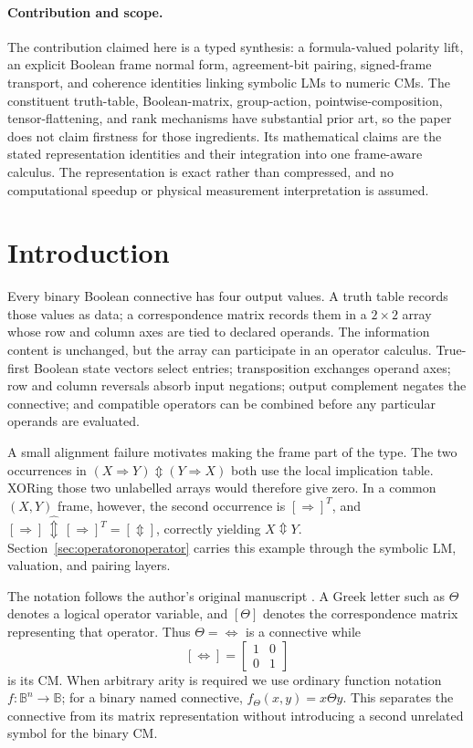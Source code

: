 \documentclass[11pt]{article}
\theoremstyle{definition}
\theoremstyle{remark}
\newcommand{\B}{\mathbb B}
\newcommand{\xor}{\mathbin{\Updownarrow}}
\begin{document}
\paragraph{Contribution and scope.}
The contribution claimed here is a typed synthesis: a formula-valued polarity lift, an explicit Boolean frame normal form, agreement-bit pairing, signed-frame transport, and coherence identities linking symbolic LMs to numeric CMs.  The constituent truth-table, Boolean-matrix, group-action, pointwise-composition, tensor-flattening, and rank mechanisms have substantial prior art, so the paper does not claim firstness for those ingredients.  Its mathematical claims are the stated representation identities and their integration into one frame-aware calculus.  The representation is exact rather than compressed, and no computational speedup or physical measurement interpretation is assumed.

\section{Introduction}

Every binary Boolean connective has four output values.  A truth table records those values as data; a correspondence matrix records them in a $2\times2$ array whose row and column axes are tied to declared operands.  The information content is unchanged, but the array can participate in an operator calculus.  True-first Boolean state vectors select entries; transposition exchanges operand axes; row and column reversals absorb input negations; output complement negates the connective; and compatible operators can be combined before any particular operands are evaluated.

A small alignment failure motivates making the frame part of the type.  The two occurrences in $(X\Rightarrow Y)\xor(Y\Rightarrow X)$ both use the local implication table.  XORing those two unlabelled arrays would therefore give zero.  In a common $(X,Y)$ frame, however, the second occurrence is $[\Rightarrow]^T$, and $[\Rightarrow]\,\widehat{\Updownarrow}\,[\Rightarrow]^T=[\Updownarrow]$, correctly yielding $X\xor Y$.  Section~\ref{sec:operatoronoperator} carries this example through the symbolic LM, valuation, and pairing layers.

The notation follows the author's original manuscript \cite{Droncheff2018}.  A Greek letter such as $\Theta$ denotes a logical operator variable, and $[\Theta]$ denotes the correspondence matrix representing that operator.  Thus $\Theta=\Leftrightarrow$ is a connective while
\[
 [\Leftrightarrow]=\begin{bmatrix}1&0\\0&1\end{bmatrix}
\]
is its CM.  When arbitrary arity is required we use ordinary function notation $f:\B^n\to\B$; for a binary named connective, $f_\Theta(x,y)=x\Theta y$.  This separates the connective from its matrix representation without introducing a second unrelated symbol for the binary CM.
\end{document}
